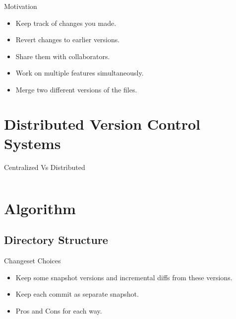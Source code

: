 \documentclass[xcolor=dvipsnames]{beamer}
\begin{document}
\begin{frame}{Motivation}
\begin{itemize}
\item Keep track of changes you made.
\item Revert changes to earlier versions.
\item Share them with collaborators.
\item Work on multiple features simultaneously.
\item Merge two different versions of the files.
\end{itemize}
\end {frame}

\section{Distributed Version Control Systems}
\begin{frame}{Centralized Vs Distributed}

\begin{columns}[c]
\column{5cm}
\column{5cm}

\end{columns}
\end{frame}

\section{Algorithm}

\subsection{Directory Structure}

\begin{frame}{Changeset Choices}
\begin{itemize}
\item Keep some snapshot versions and incremental diffs from these versions.
\item Keep each commit as separate snapshot.
\item Pros and Cons for each way.
\end{itemize}
\end{frame}
\end{document}
